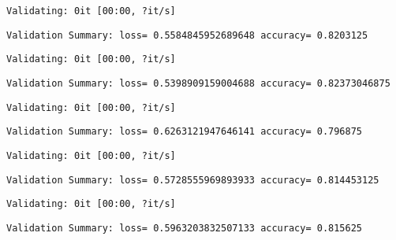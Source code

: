 \documentclass[11pt]{article}
\begin{document}
    
    \begin{Verbatim}[commandchars=\\\{\}]
Validating: 0it [00:00, ?it/s]
    \end{Verbatim}

    
    \begin{Verbatim}[commandchars=\\\{\}]
Validation Summary: loss= 0.5584845952689648 accuracy= 0.8203125
    \end{Verbatim}

    
    \begin{Verbatim}[commandchars=\\\{\}]
Validating: 0it [00:00, ?it/s]
    \end{Verbatim}

    
    \begin{Verbatim}[commandchars=\\\{\}]
Validation Summary: loss= 0.5398909159004688 accuracy= 0.82373046875
    \end{Verbatim}

    
    \begin{Verbatim}[commandchars=\\\{\}]
Validating: 0it [00:00, ?it/s]
    \end{Verbatim}

    
    \begin{Verbatim}[commandchars=\\\{\}]
Validation Summary: loss= 0.6263121947646141 accuracy= 0.796875
    \end{Verbatim}

    
    \begin{Verbatim}[commandchars=\\\{\}]
Validating: 0it [00:00, ?it/s]
    \end{Verbatim}

    
    \begin{Verbatim}[commandchars=\\\{\}]
Validation Summary: loss= 0.5728555969893933 accuracy= 0.814453125
    \end{Verbatim}

    
    \begin{Verbatim}[commandchars=\\\{\}]
Validating: 0it [00:00, ?it/s]
    \end{Verbatim}

    
    \begin{Verbatim}[commandchars=\\\{\}]
Validation Summary: loss= 0.5963203832507133 accuracy= 0.815625
    \end{Verbatim}
\end{document}
